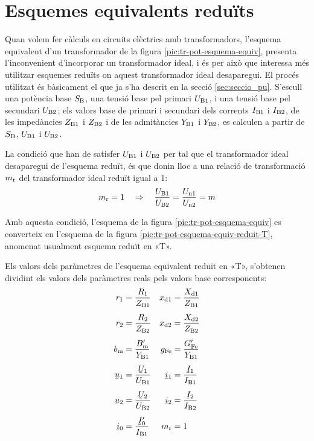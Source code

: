 \section{Esquemes equivalents reduïts}

Quan  volem fer càlculs en circuits elèctrics amb transformadors, l'esquema equivalent d'un transformador de la figura  \vref{pic:tr-pot-esquema-equiv}, presenta l'inconvenient d'incorporar un transformador ideal, i és per això que interessa més utilitzar esquemes reduïts on aquest transformador ideal desaparegui.
El procés utilitzat és bàsicament el que ja s'ha descrit en la secció \vref{sec:seccio_pu}. S'escull una potència base $S_\mathrm{B}$, una tensió base pel primari $U_\mathrm{B1}$, i una tensió base pel secundari $U_\mathrm{B2}$; els valors base de primari i secundari dels corrents $I_\mathrm{B1}$ i $I_\mathrm{B2}$, de les impedàncies $Z_\mathrm{B1}$ i $Z_\mathrm{B2}$ i de les admitàncies $Y_\mathrm{B1}$ i $Y_\mathrm{B2}$, es calculen a partir de $S_\mathrm{B}$, $U_\mathrm{B1}$ i $U_\mathrm{B2}$.

La condició que han de satisfer $U_\mathrm{B1}$ i $U_\mathrm{B2}$ per tal que el transformador ideal desaparegui de l'esquema reduït, és que donin lloc a una relació de transformació $m_\mathrm{r}$ del transformador ideal reduït igual a  1:
\begin{equation}\label{eq:mr}
    m_\mathrm{r} = 1 \quad \Rightarrow \quad \frac{U_\mathrm{B1}}{U_\mathrm{B2}} = \frac{U_\mathrm{n1}}{U_\mathrm{n2}} = m
\end{equation}

 Amb aquesta condició, l'esquema de la figura \vref{pic:tr-pot-esquema-equiv} es converteix en l'esquema de la figura
\vref{pic:tr-pot-esquema-equiv-reduit-T}, anomenat usualment esquema reduït en «T».

\begin{center}
    
    \label{pic:tr-pot-esquema-equiv-reduit-T}
\end{center}

Els valors dels paràmetres de l'esquema equivalent reduït en «T», s'obtenen dividint els valors dels paràmetres reals pels valors base corresponents:
\begin{align}
    r\ped{1} &=\frac{R\ped{1}}{Z\ped{B1}} &   x\ped{d1} &=\frac{X\ped{d1}}{Z\ped{B1}} \\[1ex]
    r\ped{2} &=\frac{R\ped{2}}{Z\ped{B2}} &   x\ped{d2} &=\frac{X\ped{d2}}{Z\ped{B2}} \\[1ex]
    b\ped{m} &=\frac{B\ped{m}'}{Y\ped{B1}}  &   g\ped{Fe} &=\frac{G\ped{Fe}'}{Y\ped{B1}} \\[1ex]
    \cmplx{u}_1 &=\frac{\cmplx{U}_1}{U\ped{B1}} &   \cmplx{i}_1 &=\frac{\cmplx{I}_1}{I\ped{B1}} \\[1ex]
    \cmplx{u}_2 &=\frac{\cmplx{U}_2}{U\ped{B2}} &   \cmplx{i}_2 &=\frac{\cmplx{I}_2}{I\ped{B2}} \\[1ex]
    \cmplx{i}_0 &=\frac{\cmplx{I}_0'}{I\ped{B1}} &   m\ped{r} &=1
\end{align}

